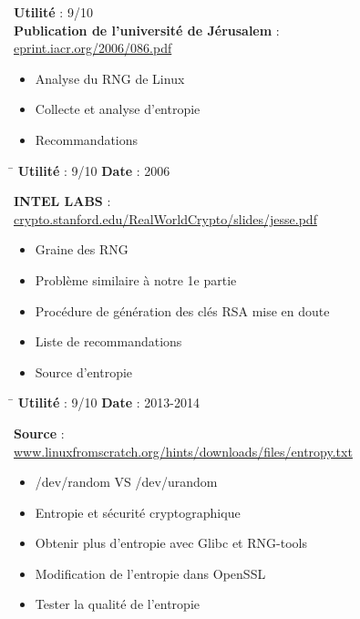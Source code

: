 \documentclass{article}
\begin{document}
	\textbf{Utilité} : 9/10\\

	\textbf{Publication de l'université de Jérusalem} : \\
	\href{http://eprint.iacr.org/2006/086.pdf}
	{eprint.iacr.org/2006/086.pdf}\\

	\begin{itemize}
		\item Analyse du RNG de Linux
		\item Collecte et analyse d'entropie
		\item Recommandations\\
	\end{itemize}
	
	\begin{tabbing}
		\hspace{10cm}\=\kill
		\textbf{Utilité} : 9/10 \>	\textbf{Date} : 2006\\
	\end{tabbing}

	\textbf{INTEL LABS} : \\
	\href{https://crypto.stanford.edu/RealWorldCrypto/slides/jesse.pdf}
	{crypto.stanford.edu/RealWorldCrypto/slides/jesse.pdf}\\

	\begin{itemize}
		\item Graine des RNG
		\item Problème similaire à notre 1e partie
		\item Procédure de génération des clés RSA mise en doute
		\item Liste de recommandations
		\item Source d'entropie
	\end{itemize}
		
	\begin{tabbing}
		\hspace{10cm}\=\kill
		\textbf{Utilité} : 9/10 \>	\textbf{Date} : 2013-2014\\
	\end{tabbing}

	\textbf{Source} : \\
	\href{http://www.linuxfromscratch.org/hints/downloads/files/entropy.txt}
	{www.linuxfromscratch.org/hints/downloads/files/entropy.txt}\\

	\begin{itemize}
		\item /dev/random VS /dev/urandom
		\item Entropie et sécurité cryptographique
		\item Obtenir plus d'entropie avec Glibc et RNG-tools
		\item Modification de l'entropie dans OpenSSL
		\item Tester la qualité de l'entropie\\
	\end{itemize}
\end{document}
